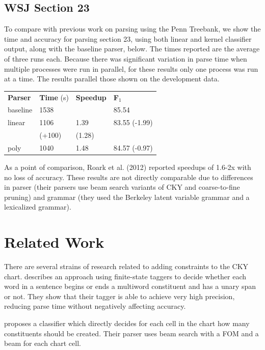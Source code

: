 \documentclass[11pt]{article}
\begin{document}
\subsection{WSJ Section 23}
\label{sec-5-5}

To compare with previous work on parsing using the Penn Treebank, we show the
time and accuracy for parsing section 23, using both linear and kernel
classifier output, along with the baseline parser, below. The times reported are
the average of three runs each. Because there was significant variation in parse
time when multiple processes were run in parallel, for these results only one
process was run at a time. The results parallel those shown on the development
data.

\begin{center}
\begin{tabular}{llll}
{\bf Parser} & {\bf Time} (s) & {\bf Speedup} & {\bf F$_{\text{1}}$} \\
baseline & 1538 & & 85.54 \\
linear & 1106 & 1.39\texttimes{} & 83.55 (-1.99)\\
 & (+100) & (1.28\texttimes{}) &  \\
poly & 1040 & 1.48\texttimes{} & 84.57 (-0.97)\\
\end{tabular}
\end{center}

As a point of comparison, Roark et al. (2012) reported speedups of 1.6-2x with
no loss of accuracy. These results are not directly comparable due to
differences in parser (their parsers use beam search variants of CKY and
coarse-to-fine pruning) and grammar (they used the Berkeley latent variable
grammar and a lexicalized grammar).

\section{Related Work}
\label{sec-6}

There are several strains of research related to adding constraints to
the CKY chart. \cite{Roark2012} describes an approach using
finite-state taggers to decide whether each word in a sentence begins
or ends a multiword constituent and has a unary span or not. They show
that their tagger is able to achieve very high precision, reducing
parse time without negatively affecting accuracy.

\cite{Bodenstab2011} proposes a classifier which directly decides for
each cell in the chart how many constituents should be created. Their
parser uses beam search with a FOM and a beam for each chart cell.
\end{document}
